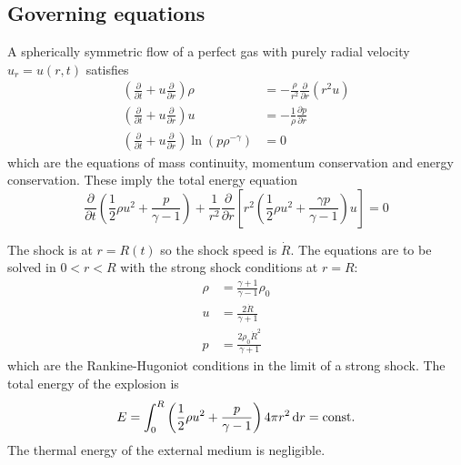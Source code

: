 \documentclass{jknotes}
\begin{document}
\subsection{Governing equations}
A spherically symmetric flow of a perfect gas with purely radial velocity $u_r
= u(r,t)$ satisfies
\begin{align}
\left( \frac{\partial}{\partial t} + u \frac{\partial}{\partial r}\right)\rho
&= -\frac{\rho}{r^2} \frac{\partial}{\partial r} (r^2 u) \label{eq:l13:1} \\
\left( \frac{\partial}{\partial t} + u \frac{\partial}{\partial r}\right)u
&= -\frac{1}{\rho} \frac{\partial p}{\partial r} \label{eq:l13:2} \\
\left( \frac{\partial}{\partial t} + u \frac{\partial}{\partial r}\right) \ln
	(p \rho^{-\gamma}) &= 0 \label{eq:l13:3}
\end{align}
which are the equations of mass continuity, momentum conservation and energy
conservation. These imply the total energy equation
\begin{equation}
	\frac{\partial}{\partial t}\left(\frac{1}{2}\rho u^2 + \frac{p}{\gamma
	-1}\right) + \frac{1}{r^2} \frac{\partial}{\partial r} \left[ r^2 \left(
	\frac{1}{2}\rho u^2 + \frac{\gamma p}{\gamma -1}\right)u\right] = 0
\end{equation}

The shock is at $r=R(t)$ so the shock speed is $\dot{R}$. The equations are to
be solved in $0 < r < R$ with the strong shock conditions at $r=R$:
\begin{align}
	\rho &= \frac{\gamma+1}{\gamma-1} \rho_0 \label{eq:l13:4}\\
	u&= \frac{2 \dot{R}}{\gamma +1}\label{eq:l13:5}\\
	p &= \frac{2\rho_0 \dot{R}^2}{\gamma +1} \label{eq:l13:6}
\end{align}
which are the Rankine-Hugoniot conditions in the limit of a strong shock. The
total energy of the explosion is
\begin{equation}
	E = \int_0^R \left( \frac{1}{2}\rho u^2 + \frac{p}{\gamma -1}\right) 4\pi
	r^2 \, \diffd r = \text{const.}
\end{equation}
The thermal energy of the external medium is negligible.
\end{document}
